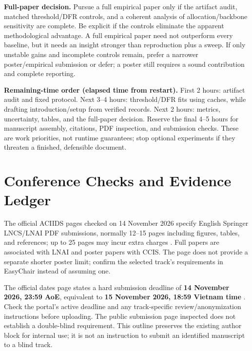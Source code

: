\documentclass[runningheads]{llncs}
\begin{document}
\textbf{Full-paper decision.} Pursue a full empirical paper only if the artifact audit, matched threshold/DFR controls, and a coherent analysis of allocation/backbone sensitivity are complete. Be explicit if the controls eliminate the apparent methodological advantage. A full empirical paper need not outperform every baseline, but it needs an insight stronger than reproduction plus a sweep. If only unstable gains and incomplete controls remain, prefer a narrower poster/empirical submission or defer; a poster still requires a sound contribution and complete reporting.

\textbf{Remaining-time order (elapsed time from restart).} First 2 hours: artifact audit and fixed protocol. Next 3--4 hours: threshold/DFR fits using caches, while drafting introduction/setup from verified records. Next 2 hours: metrics, uncertainty, tables, and the full-paper decision. Reserve the final 4--5 hours for manuscript assembly, citations, PDF inspection, and submission checks. These are work priorities, not runtime guarantees; stop optional experiments if they threaten a finished, defensible document.


\section{Conference Checks and Evidence Ledger}
The official ACIIDS pages checked on 14 November 2026 specify English Springer LNCS/LNAI PDF submissions, normally 12--15 pages including figures, tables, and references; up to 25 pages may incur extra charges \cite{aciids-submit}. Full papers are associated with LNAI and poster papers with CCIS. The page does not provide a separate shorter poster limit; confirm the selected track's requirements in EasyChair instead of assuming one.

The official dates page states a hard submission deadline of \textbf{14 November 2026, 23:59 AoE}, equivalent to \textbf{15 November 2026, 18:59 Vietnam time} \cite{aciids-dates}. Check the portal's active deadline and any track-specific review/anonymization instructions before uploading. The public submission page inspected does not establish a double-blind requirement. This outline preserves the existing author block for internal use; it is not an instruction to submit an identified manuscript to a blind track.
\end{document}
